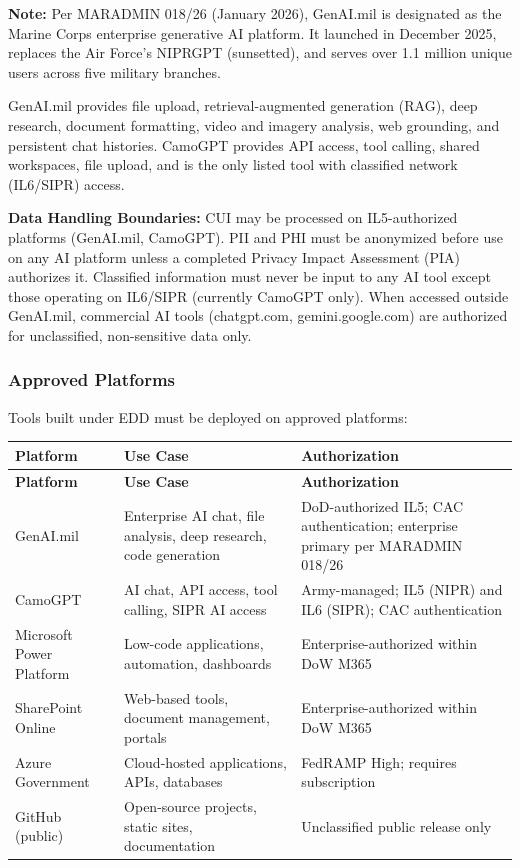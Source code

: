 \documentclass[11pt,letterpaper]{article}
\begin{document}
\textbf{Note:} Per MARADMIN 018/26 (January 2026), GenAI.mil is designated as the Marine Corps enterprise generative AI platform. It launched in December 2025, replaces the Air Force's NIPRGPT (sunsetted), and serves over 1.1 million unique users across five military branches.

GenAI.mil provides file upload, retrieval-augmented generation (RAG), deep research, document formatting, video and imagery analysis, web grounding, and persistent chat histories. CamoGPT provides API access, tool calling, shared workspaces, file upload, and is the only listed tool with classified network (IL6/SIPR) access.

\textbf{Data Handling Boundaries:} CUI may be processed on IL5-authorized platforms (GenAI.mil, CamoGPT). PII and PHI must be anonymized before use on any AI platform unless a completed Privacy Impact Assessment (PIA) authorizes it. Classified information must never be input to any AI tool except those operating on IL6/SIPR (currently CamoGPT only). When accessed outside GenAI.mil, commercial AI tools (chatgpt.com, gemini.google.com) are authorized for unclassified, non-sensitive data only.

\subsubsection{Approved Platforms}
\label{sec:approved-platforms}

Tools built under EDD must be deployed on approved platforms:

\begin{longtable}{@{}p{3.5cm}p{5cm}p{5cm}@{}}
\toprule
\textbf{Platform} & \textbf{Use Case} & \textbf{Authorization} \\
\midrule
\endfirsthead
\toprule
\textbf{Platform} & \textbf{Use Case} & \textbf{Authorization} \\
\midrule
\endhead
\bottomrule
\endlastfoot
GenAI.mil & Enterprise AI chat, file analysis, deep research, code generation & DoD-authorized IL5; CAC authentication; enterprise primary per MARADMIN 018/26 \\
\midrule
CamoGPT & AI chat, API access, tool calling, SIPR AI access & Army-managed; IL5 (NIPR) and IL6 (SIPR); CAC authentication \\
\midrule
Microsoft Power Platform & Low-code applications, automation, dashboards & Enterprise-authorized within DoW M365 \\
\midrule
SharePoint Online & Web-based tools, document management, portals & Enterprise-authorized within DoW M365 \\
\midrule
Azure Government & Cloud-hosted applications, APIs, databases & FedRAMP High; requires subscription \\
\midrule
GitHub (public) & Open-source projects, static sites, documentation & Unclassified public release only \\
\end{longtable}
\end{document}
